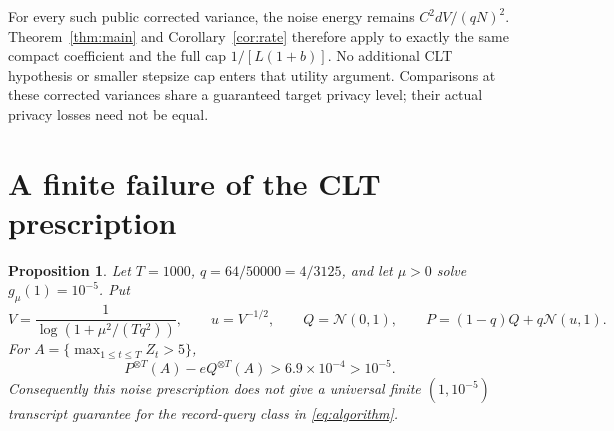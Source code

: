 \documentclass[11pt]{article}
\newtheorem{proposition}[theorem]{Proposition}
\newcommand{\N}{\mathcal N}
\begin{document}
For every such public corrected variance, the noise energy remains
$C^2dV/(qN)^2$. Theorem~\ref{thm:main} and Corollary~\ref{cor:rate} therefore
apply to exactly the same compact coefficient and the full cap
$1/[L(1+b)]$. No additional CLT hypothesis or smaller stepsize cap enters
that utility argument. Comparisons at these corrected variances share a
guaranteed target privacy level; their actual privacy losses need not be equal.

\section{A finite failure of the CLT prescription}
\label{sec:finite-clt-failure}
\begin{proposition}\label{prop:finite-clt-failure}
Let $T=1000$, $q=64/50000=4/3125$, and let $\mu>0$ solve
$g_\mu(1)=10^{-5}$. Put
\[
 V=\frac1{\log(1+\mu^2/(Tq^2))},\qquad u=V^{-1/2},\qquad
 Q=\N(0,1),\qquad P=(1-q)Q+q\N(u,1).
\]
For $A=\{\max_{1\le t\le T}Z_t>5\}$,
\[
 P^{\otimes T}(A)-eQ^{\otimes T}(A)>6.9\times10^{-4}>10^{-5}.
\]
Consequently this noise prescription does not give a universal finite
$(1,10^{-5})$ transcript guarantee for the record-query class in
\eqref{eq:algorithm}.
\end{proposition}
\end{document}
